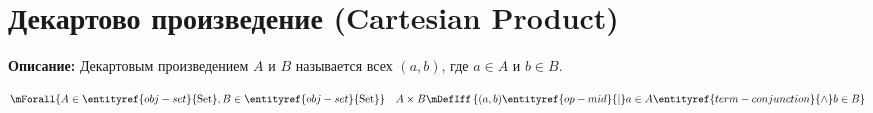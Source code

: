 
\section{Декартово произведение (Cartesian Product)}
\label{entity:obj-cartesian-product}

\textbf{Описание:}
Декартовым произведением  $A$ и $B$ называется  всех  $(a, b)$, где $a \in A$ и $b \in B$.

\hypertarget{obj-cartesian-product}{}
\hypertarget{obj-cartesian-product}{}
\begin{object}
\[
\mForall{A \in \entityref{obj-set}{\text{Set}}, B \in \entityref{obj-set}{\text{Set}}}
\quad
A \times B \mDefIff \left\{ (a, b) \entityref{op-mid}{\mid} a \in A \entityref{term-conjunction}{\land} b \in B \right\}
\]
\end{object}